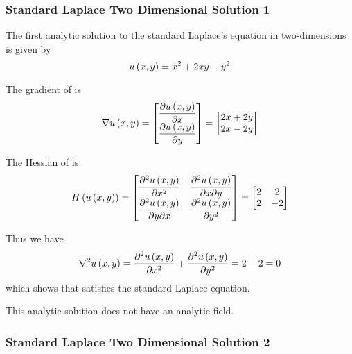 \subsubsection{Standard Laplace Two Dimensional Solution 1}

The first analytic solution to the standard Laplace's equation in two-dimensions is given by
\begin{equation}
  \fnof{u}{x,y}=x^{2}+2xy-y^{2}
  \label{eqn:StandardLaplaceTwoDAnalytic1}
\end{equation}

The gradient of  is
\begin{equation}
  \gradient{}{\fnof{u}{x,y}}=\begin{bmatrix}
  \delby{\fnof{u}{x,y}}{x} \\
  \delby{\fnof{u}{x,y}}{y}
  \end{bmatrix}=\begin{bmatrix}
  2x+2y \\
  2x-2y
  \end{bmatrix}
  \label{eqn:StandardLaplaceTwoDAnalyticGradient1}
\end{equation}

The Hessian of  is
\begin{equation}
  \hessian{}{\fnof{u}{x,y}}=\begin{bmatrix}
  \deltwosqby{\fnof{u}{x,y}}{x} & \deltwoby{\fnof{u}{x,y}}{x}{y} \\
  \deltwoby{\fnof{u}{x,y}}{y}{x} & \deltwosqby{\fnof{u}{x,y}}{y}
  \end{bmatrix}=\begin{bmatrix}
  2 & 2 \\
  2 & -2
  \end{bmatrix}
  \label{eqn:StandardLaplaceTwoDAnalyticHessian1}
\end{equation}

Thus we have
\begin{equation}
  \laplacian{}{\fnof{u}{x,y}}=\deltwosqby{\fnof{u}{x,y}}{x}+\deltwosqby{\fnof{u}{x,y}}{y}=2-2=0
\end{equation}
which shows that  satisfies the standard Laplace equation.

This analytic solution does not have an analytic field.

\subsubsection{Standard Laplace Two Dimensional Solution 2}
 
